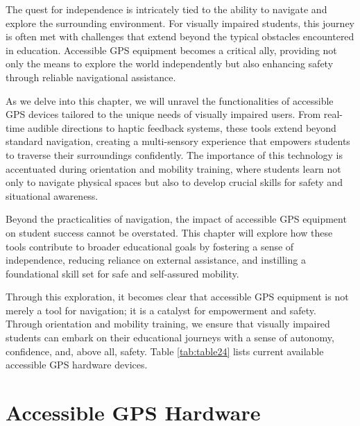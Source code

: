 \documentclass[14pt,letterpaper,twoside]{extreport}
\begin{document}
The quest for independence is intricately tied to the ability to navigate and explore the surrounding environment. For visually impaired students, this journey is often met with challenges that extend beyond the typical obstacles encountered in education. Accessible GPS equipment becomes a critical ally, providing not only the means to explore the world independently but also enhancing safety through reliable navigational assistance.

As we delve into this chapter, we will unravel the functionalities of accessible GPS devices tailored to the unique needs of visually impaired users. From real-time audible directions to haptic feedback systems, these tools extend beyond standard navigation, creating a multi-sensory experience that empowers students to traverse their surroundings confidently. The importance of this technology is accentuated during orientation and mobility training, where students learn not only to navigate physical spaces but also to develop crucial skills for safety and situational awareness.

Beyond the practicalities of navigation, the impact of accessible GPS equipment on student success cannot be overstated. This chapter will explore how these tools contribute to broader educational goals by fostering a sense of independence, reducing reliance on external assistance, and instilling a foundational skill set for safe and self-assured mobility.

Through this exploration, it becomes clear that accessible GPS equipment is not merely a tool for navigation; it is a catalyst for empowerment and safety. Through orientation and mobility training, we ensure that visually impaired students can embark on their educational journeys with a sense of autonomy, confidence, and, above all, safety.
Table \ref{tab:table24} lists current available accessible GPS hardware devices.

\pagebreak \hypertarget{accessible-gps-mapping-hardware}{}\section{Accessible GPS Hardware}\label{accessible-gps-mapping-hardware}
\end{document}
